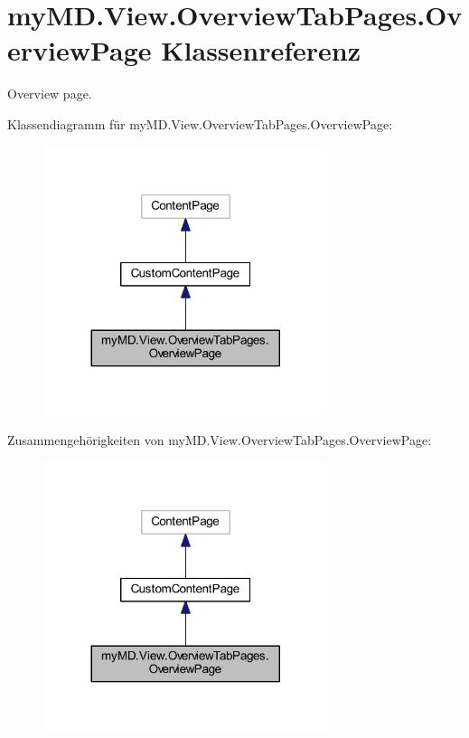 \hypertarget{classmy_m_d_1_1_view_1_1_overview_tab_pages_1_1_overview_page}{}\section{my\+M\+D.\+View.\+Overview\+Tab\+Pages.\+Overview\+Page Klassenreferenz}
\label{classmy_m_d_1_1_view_1_1_overview_tab_pages_1_1_overview_page}


Overview page.  




Klassendiagramm für my\+M\+D.\+View.\+Overview\+Tab\+Pages.\+Overview\+Page\+:\nopagebreak
\begin{figure}[H]
\begin{center}
\leavevmode
\includegraphics[width=236pt]{classmy_m_d_1_1_view_1_1_overview_tab_pages_1_1_overview_page__inherit__graph}
\end{center}
\end{figure}


Zusammengehörigkeiten von my\+M\+D.\+View.\+Overview\+Tab\+Pages.\+Overview\+Page\+:\nopagebreak
\begin{figure}[H]
\begin{center}
\leavevmode
\includegraphics[width=236pt]{classmy_m_d_1_1_view_1_1_overview_tab_pages_1_1_overview_page__coll__graph}
\end{center}
\end{figure}
